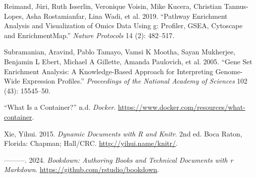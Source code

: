\documentclass[
]{book}
\newlength{\cslhangindent}
\newenvironment{CSLReferences}[2] %
 {\begin{list}{}{%
  \setlength{\itemindent}{0pt}
  \setlength{\leftmargin}{0pt}
  \setlength{\parsep}{0pt}
  \ifodd #1
   \setlength{\leftmargin}{\cslhangindent}
   \setlength{\itemindent}{-1\cslhangindent}
  \fi
  \setlength{\itemsep}{#2\baselineskip}}}
 {\end{list}}
\begin{document}
\label{refs}
\begin{CSLReferences}{1}{0}
Reimand, Jüri, Ruth Isserlin, Veronique Voisin, Mike Kucera, Christian Tannus-Lopes, Asha Rostamianfar, Lina Wadi, et al. 2019. {``Pathway Enrichment Analysis and Visualization of Omics Data Using g: Profiler, GSEA, Cytoscape and EnrichmentMap.''} \emph{Nature Protocols} 14 (2): 482--517.

Subramanian, Aravind, Pablo Tamayo, Vamsi K Mootha, Sayan Mukherjee, Benjamin L Ebert, Michael A Gillette, Amanda Paulovich, et al. 2005. {``Gene Set Enrichment Analysis: A Knowledge-Based Approach for Interpreting Genome-Wide Expression Profiles.''} \emph{Proceedings of the National Academy of Sciences} 102 (43): 15545--50.

{``What Is a Container?''} n.d. \emph{Docker}. \url{https://www.docker.com/resources/what-container}.

Xie, Yihui. 2015. \emph{Dynamic Documents with {R} and Knitr}. 2nd ed. Boca Raton, Florida: Chapman; Hall/CRC. \url{http://yihui.name/knitr/}.

---------. 2024. \emph{Bookdown: Authoring Books and Technical Documents with r Markdown}. \url{https://github.com/rstudio/bookdown}.

\end{CSLReferences}
\end{document}
